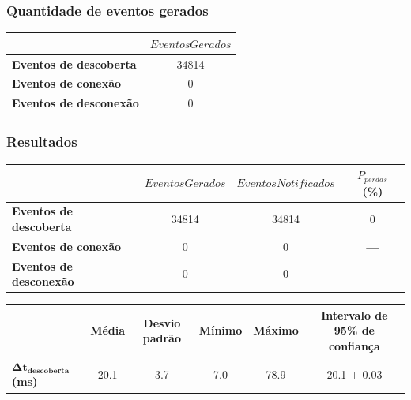 \documentclass[aspectratio=169]{beamer}
\begin{document}
\begin{frame}
	\frametitle{Quantidade de eventos gerados}
	\begin{table}
		\centering
		\begin{tabular}{lc}
			\toprule
						       & $EventosGerados$ \\
			\midrule 
			\textbf{Eventos de descoberta} & 34814            \\
			\textbf{Eventos de conexão}    & 0                \\
			\textbf{Eventos de desconexão} & 0                \\
			\bottomrule
		\end{tabular}
	\end{table}
\end{frame}

\begin{frame}
	\frametitle{Resultados}
	\newcommand{\nullval}{\textbf{---}}

	\begin{table}[htb]
		\begin{center}
			\begin{tabular}{lccc}
				\toprule
							       & $EventosGerados$ & $EventosNotificados$ & $P_{perdas}$ (\%) \\
				\midrule
				\textbf{Eventos de descoberta} & 34814            & 34814                & 0		     \\
				\textbf{Eventos de conexão}    & 0                & 0                    & \nullval	     \\
				\textbf{Eventos de desconexão} & 0                & 0                    & \nullval          \\
				\bottomrule
			\end{tabular}
		\end{center}
	\end{table}

	\bigskip

	\begin{table}[htb]
		\centering
		\begin{adjustbox}{max width=\textwidth}
			\begin{tabular}{lccccc}
				\toprule
									   & Média & Desvio padrão & Mínimo & Máximo & Intervalo de 95\% de confiança \\
				\midrule
				$\bm{\Delta t_{descoberta}}$ \textbf{(ms)} & 20.1  & 3.7           & 7.0 & 78.9 & 20.1 $\pm$ 0.03 	              \\
				\bottomrule
			\end{tabular}
		\end{adjustbox}
	\end{table}

\end{frame}
\end{document}

